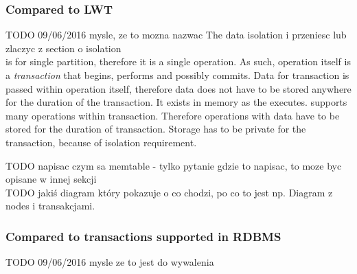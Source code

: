 \subsubsection{Compared to LWT}
TODO 09/06/2016 mysle, ze to mozna nazwac The data isolation i przeniesc lub zlaczyc z section o isolation \\
\lwt is for single partition, therefore it is a single operation. As such, operation itself is a \emph{transaction} that begins, performs and possibly commits. Data for \lwt transaction is passed within operation itself, therefore data does not have to be stored anywhere for the duration of the transaction. It exists in memory as the \lwt executes.
\mpt supports many operations within transaction. Therefore operations with data have to be stored for the duration of transaction. Storage has to be private for the transaction, because of isolation requirement.



TODO napisac czym sa memtable - tylko pytanie gdzie to napisac, to moze byc opisane w innej sekcji \\






TODO jakiś diagram który pokazuje o co chodzi, po co to jest np. Diagram z nodes i transakcjami.

\subsubsection{Compared to transactions supported in RDBMS}
TODO 09/06/2016 mysle ze to jest do wywalenia
